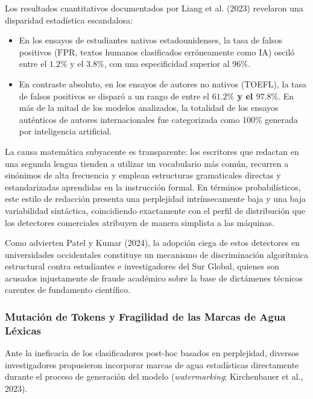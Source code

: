 Los resultados cuantitativos documentados por Liang et al. (2023) revelaron una disparidad estadística escandalosa:
\begin{itemize}
    \item En los ensayos de estudiantes nativos estadounidenses, la tasa de falsos positivos ($\text{FPR}$, textos humanos clasificados erróneamente como IA) osciló entre el $1.2\%$ y el $3.8\%$, con una especificidad superior al $96\%$.
    \item En contraste absoluto, en los ensayos de autores no nativos (TOEFL), la tasa de falsos positivos se disparó a un rango de entre el \textbf{$61.2\%$ y el $97.8\%$}. En más de la mitad de los modelos analizados, la totalidad de los ensayos auténticos de autores internacionales fue categorizada como 100\% generada por inteligencia artificial.
\end{itemize}

La causa matemática subyacente es transparente: los escritores que redactan en una segunda lengua tienden a utilizar un vocabulario más común, recurren a sinónimos de alta frecuencia y emplean estructuras gramaticales directas y estandarizadas aprendidas en la instrucción formal. En términos probabilísticos, este estilo de redacción presenta una perplejidad intrínsecamente baja y una baja variabilidad sintáctica, coincidiendo exactamente con el perfil de distribución que los detectores comerciales atribuyen de manera simplista a las máquinas.

Como advierten Patel y Kumar (2024), la adopción ciega de estos detectores en universidades occidentales constituye un mecanismo de discriminación algorítmica estructural contra estudiantes e investigadores del Sur Global, quienes son acusados injustamente de fraude académico sobre la base de dictámenes técnicos carentes de fundamento científico.

\subsubsection{Mutación de Tokens y Fragilidad de las Marcas de Agua Léxicas}

Ante la ineficacia de los clasificadores post-hoc basados en perplejidad, diversos investigadores propusieron incorporar marcas de agua estadísticas directamente durante el proceso de generación del modelo (\textit{watermarking}; Kirchenbauer et al., 2023).

